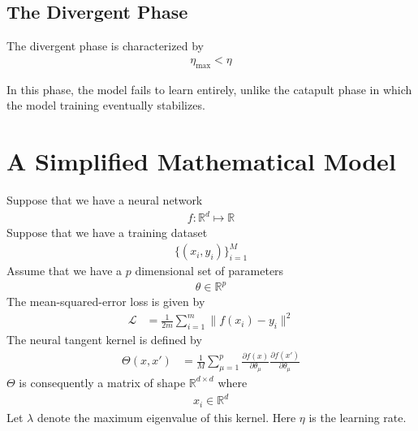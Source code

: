 \documentclass[book.tex]{subfiles}
\begin{document}
\subsection{The Divergent Phase}

The divergent phase is characterized by
\begin{align}
    \eta_{\mathrm{max}} < \eta
\end{align}

In this phase, the model fails to learn entirely, unlike the catapult phase in which the model training eventually stabilizes.


\section{A Simplified Mathematical Model}
Suppose that we have a neural network
\begin{align}
    f: \mathbb{R}^d \mapsto \mathbb{R}
\end{align}
Suppose that we have a training dataset
\begin{align}
\{(x_i, y_i)\}_{i=1}^M
\end{align}
Assume that we have a $p$ dimensional set of parameters
\begin{align}
    \theta \in \mathbb{R}^p
\end{align}
The mean-squared-error loss is given by
\begin{align}
    \mathcal{L} &= \frac{1}{2m} \sum_{i=1}^m \| f(x_{i}) -y_i \|^2
\end{align}
The neural tangent kernel is defined by
\begin{align}
    \Theta(x, x') &= \frac{1}{M} \sum_{\mu=1}^p \frac{\partial f(x)}{\partial \theta_\mu} \frac{\partial f(x')}{\partial \theta_\mu} 
\end{align}
$\Theta$ is consequently a matrix of shape $\mathbb{R}^{d \times d}$ where
\begin{align}
    x_i \in \mathbb{R}^d
\end{align}
Let $\lambda$ denote the maximum eigenvalue of this kernel.
Here $\eta$ is the learning rate. %
\end{document}
